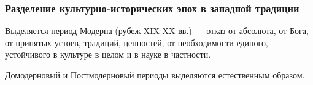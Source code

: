 \subsubsection{Разделение культурно-исторических эпох в западной традиции}

Выделяется период Модерна (рубеж XIX-XX вв.) --- отказ от абсолюта, от
Бога, от принятых устоев, традиций, ценностей, от необходимости единого,
устойчивого в культуре в целом и в науке в частности.

Домодерновый и Постмодерновый периоды выделяются естественным образом.